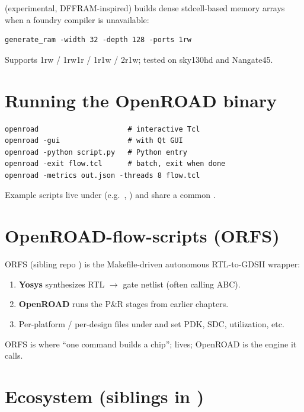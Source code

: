  (experimental, DFFRAM-inspired) builds dense stdcell-based
memory arrays when a foundry compiler is unavailable:

\begin{lstlisting}[style=ortcl]
generate_ram -width 32 -depth 128 -ports 1rw
\end{lstlisting}

Supports 1rw / 1rw1r / 1r1w / 2r1w; tested on sky130hd and Nangate45.

\section{Running the OpenROAD binary}

\begin{lstlisting}[style=ortcl]
openroad                     # interactive Tcl
openroad -gui                # with Qt GUI
openroad -python script.py   # Python entry
openroad -exit flow.tcl      # batch, exit when done
openroad -metrics out.json -threads 8 flow.tcl
\end{lstlisting}

Example scripts live under  (e.g.\ ,
) and share a common .

\section{OpenROAD-flow-scripts (ORFS)}

ORFS (sibling repo ) is the
Makefile-driven autonomous RTL-to-GDSII wrapper:

\begin{enumerate}
  \item \textbf{Yosys} synthesizes RTL $\rightarrow$ gate netlist (often
        calling ABC).
  \item \textbf{OpenROAD} runs the P\&R stages from earlier chapters.
  \item Per-platform / per-design  files under
         and  set PDK, SDC, utilization,
        etc.
\end{enumerate}

ORFS is where ``one command builds a chip''; lives; OpenROAD is the engine it
calls.

\section{Ecosystem (siblings in )}

